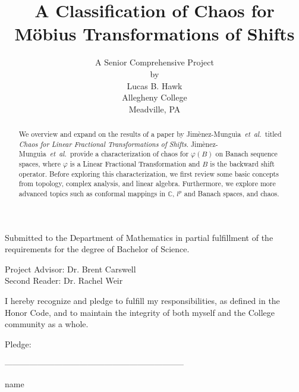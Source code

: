 \documentclass[11pt]{article}
\title{\bf{A Classification of Chaos for M{\"o}bius} Transformations of Shifts}
\theoremstyle{plain}
\theoremstyle{definition}
\newcommand{\etal}{\mbox{\emph{et al.\ }}}
\newcommand{\authors}{Jim{\`e}nez-Mungu{\`i}a\ }
\begin{document}
\author {A Senior Comprehensive Project \\
by\\
Lucas B. Hawk \\
Allegheny College\\
Meadville, PA}

\maketitle
\thispagestyle{empty}
\begin{center}
Submitted to the Department of Mathematics in partial fulfillment of the requirements for the degree of Bachelor of Science.
\end{center}

\vspace{0.5 in}
\begin{center}
Project Advisor:  Dr. Brent Carswell \\
Second Reader: Dr. Rachel Weir
\end{center}

\vspace{0.5 in}
\begin{center}
I hereby recognize and pledge to fulfill my responsibilities, as defined in the Honor Code, and to maintain the integrity of both myself and the College community as a whole.
\end{center}

\vspace{0.25 in}
\begin{center}
Pledge:

\vspace{0.5 in}
-----------------------------------------------------------------

\vspace{0.00 in}
name
\end{center}

\doublespacing
\newpage

\thispagestyle{empty}

\begin{abstract}
We overview and expand on the results of a paper by  \authors \etal titled \textit{Chaos for Linear Fractional Transformations of Shifts}.  \authors \etal provide a characterization of chaos for $\varphi(B)$ on Banach sequence spaces, where $\varphi$ is a Linear Fractional Transformation and $B$ is the backward shift operator.  Before exploring this characterization, we first review some basic concepts from topology, complex analysis, and linear algebra.  Furthermore, we explore more advanced topics such as conformal mappings in $\mathbb{C}$, $l^p$ and Banach spaces, and chaos.
\end{abstract}
\newpage
\thispagestyle{empty}
\tableofcontents
\end{document}
